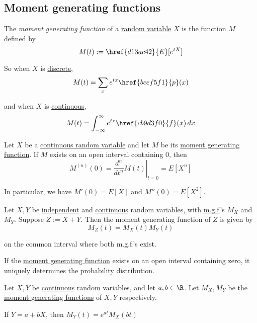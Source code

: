 \subsection{Moment generating functions}\label{a8c5947}

\label{aa65390}

The \textit{moment generating function} of a \href{b96960b}{random variable}
$X$ is the function $M$ defined by
$$
  M(t):=\href{d13ac42}{E}[e^{tX}]
$$

So when $X$ is \href{f831030}{discrete},
$$
  M(t)=\sum_xe^{tx}\href{bcef5f1}{p}(x)
$$

and when $X$ is \href{bdb1e15}{continuous},
$$
  M(t)=\int_{-\infty}^\infty e^{tx}\href{cb9d3f0}{f}(x)\,dx
$$

\label{a686ce0}

Let $X$ be a \href{bdb1e15}{continuous random variable} and let $M$ be its
\href{aa65390}{moment generating function}. If $M$ exists on an open interval
containing 0, then
$$
  M^{(n)}(0)=\left.\frac{d^n}{dt^n}M(t)\right|_{t=0}=E[X^n]
$$

In particular, we have $M'(0)=E[X]$ and $M''(0)=E[X^2]$.

\label{b57f83d}

Let $X,Y$ be \href{f0da4c0}{independent} and \href{bdb1e15}{continuous} random
variables, with \href{aa65390}{m.g.f.}'s $M_X$ and $M_Y$. Suppose $Z:=X+Y$.
Then the moment generating function of $Z$ is given by
$$
  M_Z(t)=M_X(t)M_Y(t)
$$

on the common interval where both m.g.f.'s exist.

\label{cb0747d}

If the \href{aa65390}{moment generating function} exists on an open interval
containing zero, it uniquely determines the probability distribution.

\label{eb8f692}

Let $X,Y$ be \href{bdb1e15}{continuous} random variables, and let $a,b\in\R$.
Let $M_X,M_Y$ be the \href{aa65390}{moment generating functions} of $X,Y$
respectively.
\begin{enumerati}
  \item If $Y=a+bX$, then $M_Y(t)=e^{at}M_X(bt)$
\end{enumerati}

